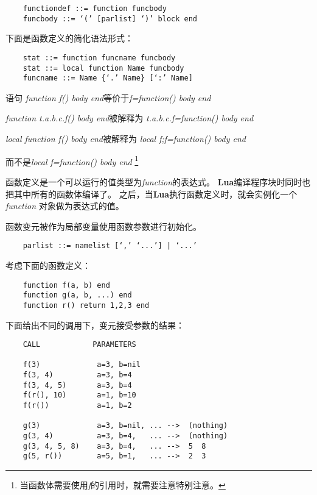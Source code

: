 \documentclass{ctexart}
\begin{document}
\lstset{language=C}
\begin{lstlisting}
	functiondef ::= function funcbody
	funcbody ::= ‘(’ [parlist] ‘)’ block end
\end{lstlisting}

下面是函数定义的简化语法形式：

\lstset{language=C}
\begin{lstlisting}
	stat ::= function funcname funcbody
	stat ::= local function Name funcbody
	funcname ::= Name {‘.’ Name} [‘:’ Name]
\end{lstlisting}

语句
\emph{function f() body end}等价于\emph{f=function() body end}

\emph{function t.a.b.c.f() body end}被解释为
\emph{t.a.b.c.f=function() body end}

\emph{local function f() body end}被解释为
\emph{local f;f=function() body end}

而不是\emph{local f=function() body end}
\footnote{当函数体需要使用\emph{f}的引用时，就需要注意特别注意。}

函数定义是一个可以运行的值类型为\emph{function}的表达式。
\textbf{Lua}编译程序块时同时也把其中所有的函数体编译了。
之后，当\textbf{Lua}执行函数定义时，就会实例化一个\emph{function}
对象做为表达式的值。

函数变元被作为局部变量使用函数参数进行初始化。

\lstset{language=C}
\begin{lstlisting}
	parlist ::= namelist [‘,’ ‘...’] | ‘...’
\end{lstlisting}

考虑下面的函数定义：

\lstset{language=C}
\begin{lstlisting}
	function f(a, b) end
	function g(a, b, ...) end
	function r() return 1,2,3 end
\end{lstlisting}

下面给出不同的调用下，变元接受参数的结果：

\lstset{language=C}
\begin{lstlisting}
	CALL            PARAMETERS
	     
	f(3)             a=3, b=nil
	f(3, 4)          a=3, b=4
	f(3, 4, 5)       a=3, b=4
	f(r(), 10)       a=1, b=10
	f(r())           a=1, b=2
	     
	g(3)             a=3, b=nil, ... -->  (nothing)
	g(3, 4)          a=3, b=4,   ... -->  (nothing)
	g(3, 4, 5, 8)    a=3, b=4,   ... -->  5  8
	g(5, r())        a=5, b=1,   ... -->  2  3
\end{lstlisting}
\end{document}
